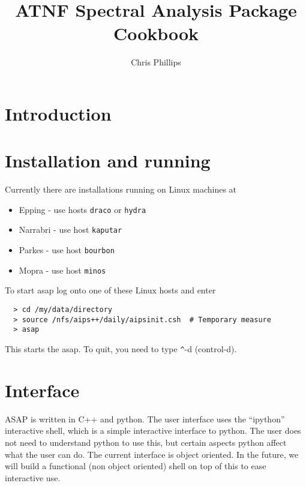 \documentclass[11pt]{article}
\title{ATNF Spectral Analysis Package\\Cookbook }
\author{Chris Phillips}
\begin{document}
\maketitle

\section{Introduction}



\section{Installation and running}

Currently there are installations running on Linux machines at 

\begin{itemize}
\item Epping - use hosts {\tt draco} or {\tt hydra}
\item Narrabri - use host {\tt kaputar}
\item Parkes - use host {\tt bourbon}
\item Mopra - use host {\tt minos}
\end{itemize}

To start asap log onto one of these Linux hosts and  enter

\begin{verbatim}
  > cd /my/data/directory
  > source /nfs/aips++/daily/aipsinit.csh  # Temporary measure
  > asap
\end{verbatim}

This starts the asap. To quit, you need to type  \verb+^+-d (control-d).

\section{Interface}

ASAP is written in C++ and python. The user interface uses the
``ipython'' interactive shell, which is a simple interactive interface
to python. The user does not need to understand python to use this,
but certain aspects python affect what the user can do.  The current
interface is object oriented.  In the future, we will build a
functional (non object oriented) shell on top of this to ease
interactive use.
\end{document}
